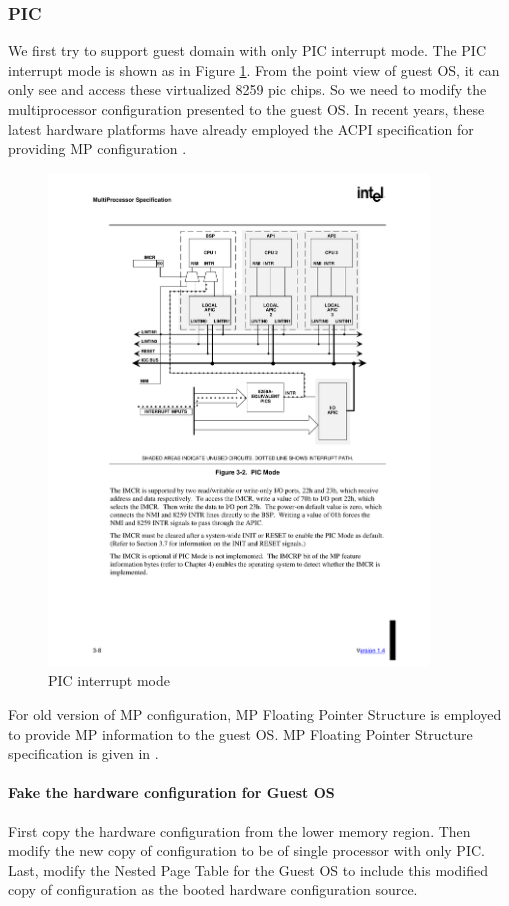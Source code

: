 \documentclass[a4paper,12pt]{article}
\begin{document}
\subsubsection{PIC}
We first try to support guest domain with only PIC interrupt mode. The PIC interrupt mode is shown as in Figure \ref{fig:picmode}.  From the point view of guest OS, it can only see and access these virtualized 8259 pic chips. So we need to modify the multiprocessor  configuration  presented to the guest OS.   In recent years, these latest hardware platforms have already employed the ACPI specification for providing MP configuration \cite{ACPI4}.
\begin{figure}[!ht]
 \centerline{
 \includegraphics[width=0.9\textwidth]{pic_mode}}
 \caption{PIC interrupt mode} \label{fig:picmode}
\end{figure}

For old version of MP configuration, MP Floating Pointer Structure is employed to provide MP information to the guest OS.   MP Floating Pointer Structure specification is given in  \cite{MP}. 

\paragraph{Fake the hardware configuration for Guest OS} 
First copy the hardware configuration from the lower memory region. Then modify the new copy of configuration to be of single processor with only PIC.  Last, modify the Nested Page Table for the Guest OS to include this modified copy of configuration as the booted hardware configuration source. 
\end{document}
